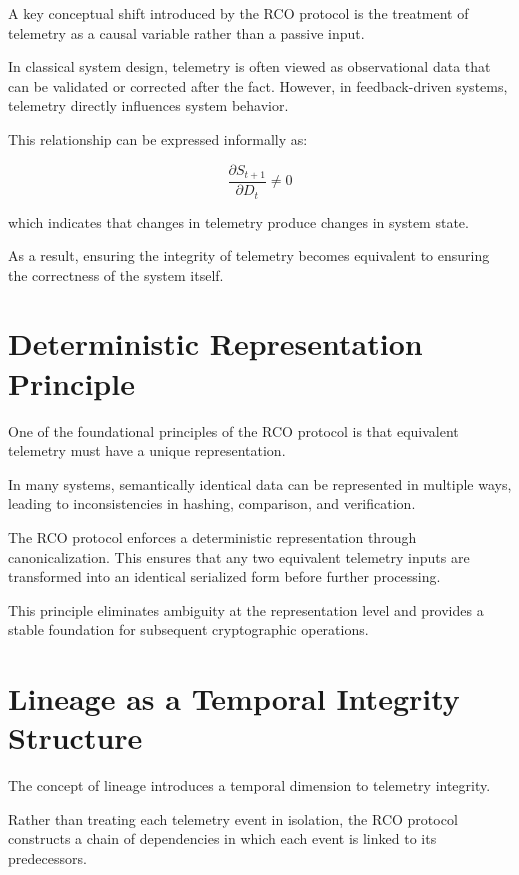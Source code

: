A key conceptual shift introduced by the RCO protocol is the treatment of telemetry as a causal variable rather than a passive input.

In classical system design, telemetry is often viewed as observational data that can be validated or corrected after the fact. However, in feedback-driven systems, telemetry directly influences system behavior.

This relationship can be expressed informally as:

\begin{equation}
\frac{\partial S_{t+1}}{\partial D_t} \neq 0
\end{equation}

which indicates that changes in telemetry produce changes in system state.

As a result, ensuring the integrity of telemetry becomes equivalent to ensuring the correctness of the system itself.

\section{Deterministic Representation Principle}

One of the foundational principles of the RCO protocol is that equivalent telemetry must have a unique representation.

In many systems, semantically identical data can be represented in multiple ways, leading to inconsistencies in hashing, comparison, and verification.

The RCO protocol enforces a deterministic representation through canonicalization. This ensures that any two equivalent telemetry inputs are transformed into an identical serialized form before further processing.

This principle eliminates ambiguity at the representation level and provides a stable foundation for subsequent cryptographic operations.

\section{Lineage as a Temporal Integrity Structure}

The concept of lineage introduces a temporal dimension to telemetry integrity.

Rather than treating each telemetry event in isolation, the RCO protocol constructs a chain of dependencies in which each event is linked to its predecessors.

